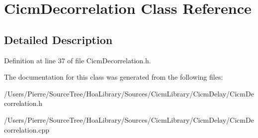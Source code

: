 \hypertarget{class_cicm_decorrelation}{\section{Cicm\-Decorrelation Class Reference}
\label{class_cicm_decorrelation}
}


\subsection{Detailed Description}


Definition at line 37 of file Cicm\-Decorrelation.\-h.



The documentation for this class was generated from the following files\-:\begin{DoxyCompactItemize}
\item 
/\-Users/\-Pierre/\-Source\-Tree/\-Hoa\-Library/\-Sources/\-Cicm\-Library/\-Cicm\-Delay/Cicm\-Decorrelation.\-h\item 
/\-Users/\-Pierre/\-Source\-Tree/\-Hoa\-Library/\-Sources/\-Cicm\-Library/\-Cicm\-Delay/Cicm\-Decorrelation.\-cpp\end{DoxyCompactItemize}
